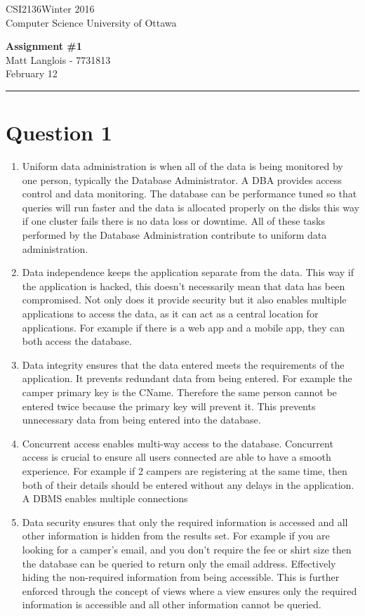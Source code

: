 \documentclass[fleqn, 12pt]{article}
\newcommand{\name}{Matt Langlois}
\newcommand{\studentNumber}{7731813}
\newcommand{\semester}{Winter 2016}
\newcommand{\assignemntNumber}{1}
\newcommand{\dueDate}{February 12}
\newcommand{\courseCode}{CSI2136}
\newcommand{\makeheader}{
    \noindent
    \courseCode \hfill \semester\\
    Computer Science \hfill University of Ottawa
    \begin{center}
        \textbf{Assignment \#\assignemntNumber}\\
        \name \hspace{1pt} - \studentNumber\\
        \dueDate\\ 
    \end{center}
    \vspace{6pt}
    \hrule
    \vspace{6pt}
}
\begin{document}
\thispagestyle{firstpage}
\makeheader

\section*{Question 1}

\begin{enumerate}[1.]
    \item
        Uniform data administration is when all of the data is being monitored by one person, typically the Database Administrator. A DBA provides access control and data monitoring. The database can be performance tuned so that queries will run faster and the data is allocated properly on the disks this way if one cluster fails there is no data loss or downtime. All of these tasks performed by the Database Administration contribute to uniform data administration.
    \item 
        Data independence keeps the application separate from the data. This way if the application is hacked, this doesn't necessarily mean that data has been compromised. Not only does it provide security but it also enables multiple applications to access the data, as it can act as a central location for applications. For example if there is a web app and a mobile app, they can both access the database.
    \item
        Data integrity ensures that the data entered meets the requirements of the application. It prevents redundant data from being entered. For example the camper primary key is the CName. Therefore the same person cannot be entered twice because the primary key will prevent it. This prevents unnecessary data from being entered into the database.
    \item
        Concurrent access enables multi-way access to the database. Concurrent access is crucial to ensure all users connected are able to have a smooth experience. For example if 2 campers are registering at the same time, then both of their details should be entered without any delays in the application. A DBMS enables multiple connections
    \item
        Data security ensures that only the required information is accessed and all other information is hidden from the results set. For example if you are looking for a camper's email, and you don't require the fee or shirt size then the database can be queried to return only the email address. Effectively hiding the non-required information from being accessible. This is further enforced through the concept of views where a view ensures only the required information is accessible and all other information cannot be queried.
\end{enumerate}
\end{document}
